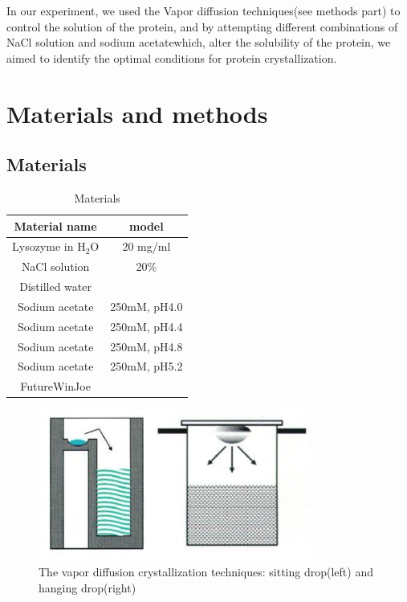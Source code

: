 \documentclass[a4paper,english,12pt,bibliography=totoc]{scrreprt}
\begin{document}
In our experiment, we used the Vapor diffusion techniques(see methods part) to control the solution of the protein, and by attempting different combinations of NaCl solution and sodium acetatewhich, alter the solubility of the protein, we aimed to identify the optimal conditions for protein crystallization.

\chapter{Materials and methods}

\section{Materials}

\begin{table}[h]
\centering
\begin{tabular}{|c|c|}
  \hline
  Material name & model \\
  \hline
  Lysozyme in \(\mathrm{H_2O }\) & 20 mg/ml \\
    \hline
  NaCl solution & 20\%  \\
    \hline
  Distilled water &  \\
    \hline
Sodium acetate & 250mM, pH4.0\\
  \hline
  Sodium acetate & 250mM, pH4.4\\
  \hline
  Sodium acetate & 250mM, pH4.8\\
  \hline
  Sodium acetate & 250mM, pH5.2\\
  \hline
  FutureWinJoe & \\
  \hline
\end{tabular}
\caption{Materials}
\label{tab:material}
\end{table}

\begin{figure}[H]
        \centering
        \includegraphics[width=0.8\textwidth]{2. First draft of protein crystalization/Images/Vapour diffusion techniques.png}
	    \caption{The vapor diffusion crystallization techniques: sitting drop(left) and hanging drop(right)}
\end{figure}
\end{document}
